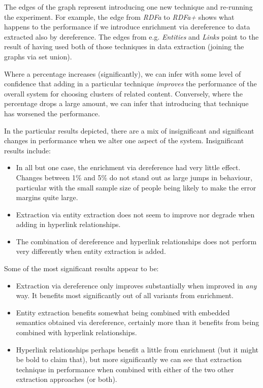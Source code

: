 The edges of the graph represent introducing one new technique and
re-running the experiment. For example, the edge from \emph{RDFa} to
\emph{RDFa+} shows what happens to the performance if we introduce
enrichment via dereference to data extracted also by dereference.
The edges from e.g. \emph{Entities} and \emph{Links} point to
the result of having used both of those techniques in data extraction
(joining the graphs via set union).

Where a percentage increases (significantly), we can infer with some
level of confidence that adding in a particular technique
\emph{improves} the performance of the overall system for choosing
clusters of related content. Conversely, where the percentage drops
a large amount, we can infer that introducing that technique has
worsened the performance.

In the particular results depicted, there are a mix of insignificant
and significant changes in performance when we alter one aspect of
the system. Insignificant results include:

\begin{itemize}
\item In all but one case, the enrichment via dereference had
  very little effect. Changes between 1\% and 5\% do not stand out
  as large jumps in behaviour, particular with the small sample size
  of people being likely to make the error margins quite large.
\item Extraction via entity extraction does not seem to improve nor
  degrade when adding in hyperlink relationships.
\item The combination of dereference and hyperlink relationships
  does not perform very differently when entity extraction is added.
\end{itemize}

Some of the most significant results appear to be:

\begin{itemize}
\item Extraction via dereference only improves substantially when
  improved in \emph{any} way. It benefits most significantly out of
  all variants from enrichment.
\item Entity extraction benefits somewhat being combined with
  embedded semantics obtained via dereference, certainly more than
  it benefits from being combined with hyperlink relationships.
\item Hyperlink relationships perhaps benefit a little from
  enrichment (but it might be bold to claim that), but more significantly
  we can see that extraction technique in performance when combined
  with either of the two other extraction approaches (or both).
\end{itemize}

